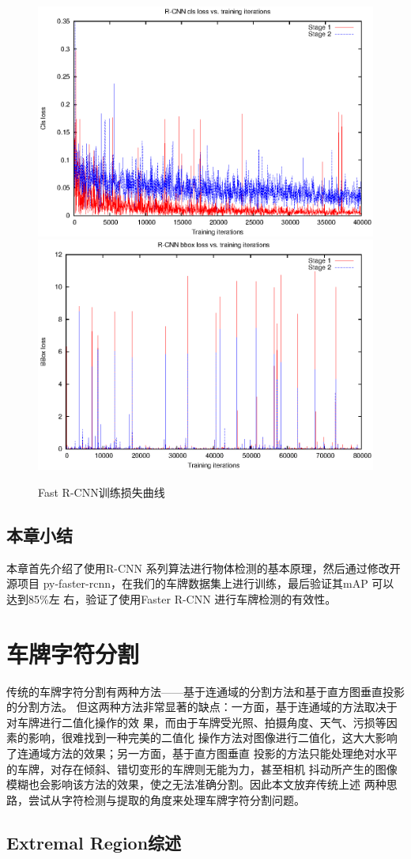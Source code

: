 \begin{figure}[ht]
\centering
{}
{\includegraphics[width=.45\linewidth]{./Figure/RCNNClsLoss.eps}}
{\includegraphics[width=.45\linewidth]{./Figure/RCNNBBoxLoss.eps}}
\caption{Fast R-CNN训练损失曲线}
\end{figure}

\section{本章小结}

本章首先介绍了使用R-CNN 系列算法进行物体检测的基本原理，然后通过修改开源项目
py-faster-rcnn，在我们的车牌数据集上进行训练，最后验证其mAP 可以达到85\%左
右，验证了使用Faster R-CNN 进行车牌检测的有效性。

\chapter{车牌字符分割}

传统的车牌字符分割有两种方法——基于连通域的分割方法和基于直方图垂直投影的分割方法。
但这两种方法非常显著的缺点：一方面，基于连通域的方法取决于对车牌进行二值化操作的效
果，而由于车牌受光照、拍摄角度、天气、污损等因素的影响，很难找到一种完美的二值化
操作方法对图像进行二值化，这大大影响了连通域方法的效果；另一方面，基于直方图垂直
投影的方法只能处理绝对水平的车牌，对存在倾斜、错切变形的车牌则无能为力，甚至相机
抖动所产生的图像模糊也会影响该方法的效果，使之无法准确分割。因此本文放弃传统上述
两种思路，尝试从字符检测与提取的角度来处理车牌字符分割问题。

\section{Extremal Region综述}

